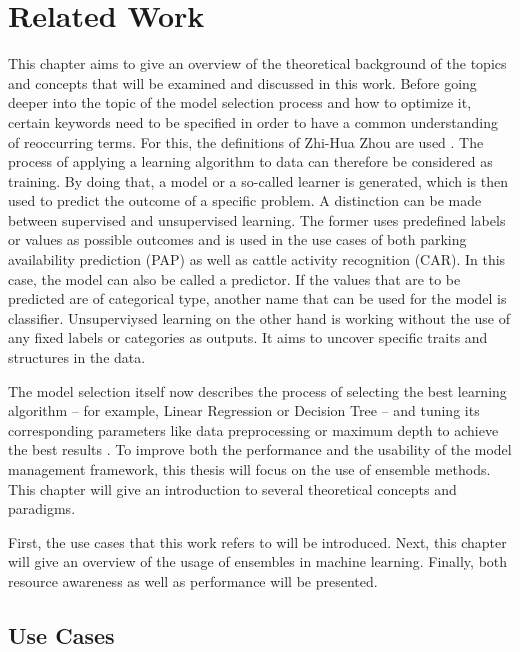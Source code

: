 \chapter{Related Work} \label{chap:relatedwork}

This chapter aims to give an overview of the theoretical background of the topics and concepts that will be examined and discussed in this work. Before going deeper into the topic of the model selection process and how to optimize it, certain keywords need to be specified in order to have a common understanding of reoccurring terms. For this, the definitions of Zhi-Hua Zhou are used \cite{zhou2012}. The process of applying a learning algorithm to data can therefore be considered as training. By doing that, a model or a so-called learner is generated, which is then used to predict the outcome of a specific problem. A distinction can be made between supervised and unsupervised learning. The former uses predefined labels or values as possible outcomes and is used in the use cases of both parking availability prediction (PAP) as well as cattle activity recognition (CAR). In this case, the model can also be called a predictor. If the values that are to be predicted are of categorical type, another name that can be used for the model is classifier. Unsuperviysed learning on the other hand is working without the use of any fixed labels or categories as outputs. It aims to uncover specific traits and structures in the data.

The model selection itself now describes the process of selecting the best learning algorithm – for example, Linear Regression or Decision Tree – and tuning its corresponding parameters like data preprocessing or maximum depth to achieve the best results \cite{zhou2012}. To improve both the performance and the usability of the model management framework, this thesis will focus on the use of ensemble methods. This chapter will give an introduction to several theoretical concepts and paradigms. 

First, the use cases that this work refers to will be introduced. Next, this chapter will give an overview of the usage of ensembles in machine learning. Finally, both resource awareness as well as performance will be presented.





\section{Use Cases}\label{usecases}

